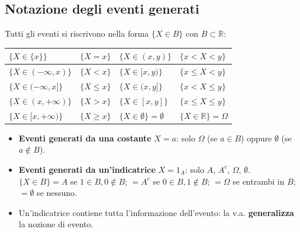 \documentclass[12pt]{extarticle} %
\begin{document}
\subsection{Notazione degli eventi generati}
Tutti gli eventi si riscrivono nella forma $\{X \in B\}$ con $B \subset \mathbb{R}$:
\begin{center}
\begin{tabular}{|l|l||l|l|}
\hline
$\{X \in \{x\}\}$ & $\{X = x\}$ & $\{X \in (x,y)\}$ & $\{x < X < y\}$ \\ \hline
$\{X \in (-\infty, x)\}$ & $\{X < x\}$ & $\{X \in [x,y)\}$ & $\{x \le X < y\}$ \\ \hline
$\{X \in (-\infty, x]\}$ & $\{X \le x\}$ & $\{X \in (x,y]\}$ & $\{x < X \le y\}$ \\ \hline
$\{X \in (x,+\infty)\}$ & $\{X > x\}$ & $\{X \in [x,y]\}$ & $\{x \le X \le y\}$ \\ \hline
$\{X \in [x,+\infty)\}$ & $\{X \ge x\}$ & $\{X \in \emptyset\} = \emptyset$ & $\{X \in \mathbb{R}\} = \Omega$ \\ \hline
\end{tabular}
\end{center}
\begin{itemize}
    \item \textbf{Eventi generati da una costante} $X = a$: solo $\Omega$ (se $a \in B$) oppure $\emptyset$ (se $a \notin B$).
    \item \textbf{Eventi generati da un'indicatrice} $X = 1_A$: solo $A$, $A^c$, $\Omega$, $\emptyset$.
    \\ {\footnotesize $\{X \in B\} = A$ se $1 \in B, 0 \notin B$; $= A^c$ se $0 \in B, 1 \notin B$; $= \Omega$ se entrambi in $B$; $= \emptyset$ se nessuno.}
    \item Un'indicatrice contiene tutta l'informazione dell'evento: la v.a. \textbf{generalizza} la nozione di evento.
\end{itemize}
\end{document}
